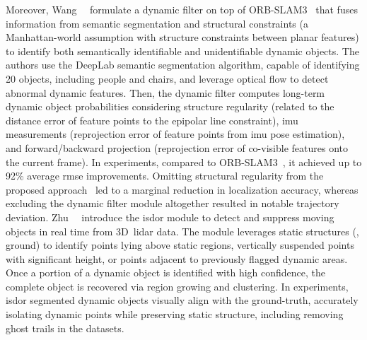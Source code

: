 Moreover, Wang~\etal~\cite{wang:tim:2025} formulate a dynamic filter
on top of ORB-SLAM3~\cite{campos:tro:2021} that fuses information
from semantic segmentation and structural constraints (a Manhattan-world
assumption with structure constraints between planar features)
to identify both semantically identifiable and unidentifiable dynamic objects.
The authors use the DeepLab semantic segmentation algorithm,
capable of identifying 20 objects, including people and chairs,
and leverage optical flow to detect abnormal dynamic features.
Then, the dynamic filter computes long-term dynamic object probabilities
considering structure regularity (related to the distance error of
feature points to the epipolar line constraint), \gls{imu} measurements
(reprojection error of feature points from \gls{imu} pose estimation),
and forward/backward projection (reprojection error of co-visible features
onto the current frame). In experiments,
compared to ORB-SLAM3~\cite{campos:tro:2021},
it achieved up to 92\% average \gls{rmse} improvements.
Omitting structural regularity from the proposed approach~\cite{wang:tim:2025}
led to a marginal reduction in localization accuracy,
whereas excluding the dynamic filter module altogether
resulted in notable trajectory deviation.
Zhu~\etal~\cite{zhu:tim:2025} introduce the \gls{isdor} module
to detect and suppress moving objects in real time from 3D~\gls{lidar} data.
The module leverages static structures (\eg, ground)
to identify points lying above static regions,
vertically suspended points with significant height,
or points adjacent to previously flagged dynamic areas.
Once a portion of a dynamic object is identified
with high confidence, the complete object is recovered
via region growing and clustering.
In experiments, \gls{isdor} segmented dynamic objects visually align
with the ground-truth, accurately isolating dynamic points while
preserving static structure, including removing ghost trails in the datasets.

